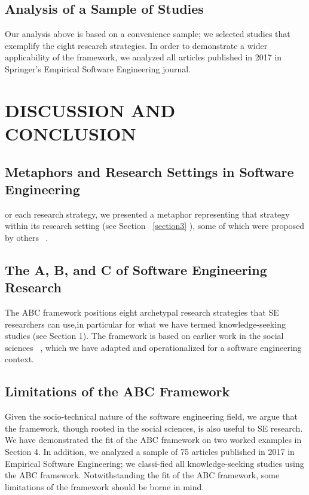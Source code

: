 \documentclass[runningheads]{llncs}
\begin{document}
\subsection{Analysis of a Sample of Studies}
Our analysis above is based on a convenience sample; we selected studies that exemplify the eight research strategies. In order to demonstrate a wider applicability of the framework, we analyzed all articles published in 2017 in Springer’s Empirical Software Engineering journal.

\section{DISCUSSION AND CONCLUSION}
\label{section5}
\subsection{Metaphors and Research Settings in Software Engineering}
or each research strategy, we presented a metaphor representing that strategy within its research setting (see Section ~\ref{section3} ), some of which were proposed by others ~\cite{ref_article4,ref_article12}.

\subsection{The A, B, and C of Software Engineering Research}
The ABC framework positions eight archetypal research strategies that SE researchers can use,in particular for what we have termed knowledge-seeking studies (see Section 1). The framework is based on earlier work in the social sciences ~\cite{ref_article1,ref_article2,ref_article3,ref_article4,ref_article5}, which we have adapted and operationalized for a software engineering context.

\subsection{Limitations of the ABC Framework}
Given the socio-technical nature of the software engineering field, we argue that the framework, though rooted in the social sciences, is also useful to SE research. We have demonstrated the fit of the ABC framework on two worked examples in Section 4. In addition, we analyzed a sample of 75 articles published in 2017 in Empirical Software Engineering; we classi-fied all knowledge-seeking studies using the ABC framework. Notwithstanding the fit of the ABC framework, some limitations of the framework should be borne in mind.
\end{document}
